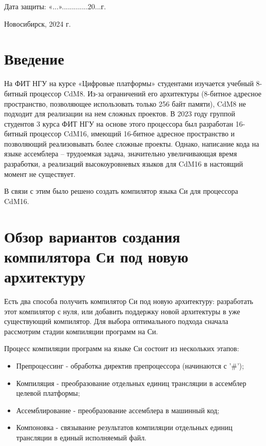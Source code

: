 \documentclass[a4paper,14pt]{extarticle}
\begin{document}
\begin{titlepage}
\begin{tabular*}{\textwidth}{l @{\hskip 4cm} l}
	\end{tabular*}
	\vfill
	\hfill
	\begin{minipage}{0.5\textwidth}
		Дата защиты: «...».............20...г.
	\end{minipage}
	
	\vfill
	
	\begin{center}
		Новосибирск, 2024 г.
	\end{center}
\end{titlepage}
	
	

\tableofcontents

\pagebreak
\section{Введение}

На ФИТ НГУ на курсе «Цифровые платформы» студентами изучается учебный 8-битный процессор CdM8. Из-за ограничений его архитектуры (8-битное адресное пространство, позволяющее использовать только 256 байт памяти), CdM8 не подходит для реализации на нем сложных проектов. В 2023 году группой студентов 3 курса ФИТ НГУ на основе этого процессора был разработан 16-битный процессор CdM16, имеющий 16-битное адресное пространство и позволяющий реализовывать более сложные проекты. Однако, написание кода на языке ассемблера – трудоемкая задача, значительно увеличивающая время разработки, а реализаций высокоуровневых языков для CdM16 в настоящий момент не существует.

В связи с этим было решено создать компилятор языка Си для процессора CdM16.

\pagebreak
\section{Обзор вариантов создания компилятора Си под новую архитектуру}

Есть два способа получить компилятор Си под новую архитектуру: разработать этот компилятор с нуля, или добавить поддержку новой архитектуры в уже существующий компилятор. Для выбора оптимального подхода сначала рассмотрим стадии компиляции программ на Си.

Процесс компиляции программ на языке Си состоит из нескольких этапов\cite{cpp_compilation}:
\begin{itemize}
	\item Препроцессинг - обработка директив препроцессора (начинаются с '\#');
	\item Компиляция - преобразование отдельных единиц трансляции в ассемблер целевой платформы;
	\item Ассемблирование - преобразование ассемблера в машинный код;
	\item Компоновка - связывание результатов компиляции отдельных единиц трансляции в единый исполняемый файл.
\end{itemize}
\end{document}
